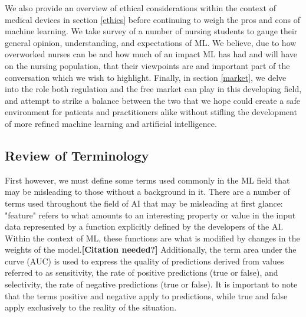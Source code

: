 \documentclass[]{article}
\begin{document}
		We also provide an overview of ethical considerations within the context of medical devices in section \ref{ethics} before continuing to weigh the pros and cons of machine learning. We take survey of a number of nursing students to gauge their general opinion, understanding, and expectations of ML. We believe, due to how overworked nurses can be\cite{doi:10.1111/j.1365-2648.2009.05082.x} and how much of an impact ML has had and will have on the nursing population\cite{Ham2017}, that their viewpoints are and important part of the conversation which we wish to highlight. Finally, in section \ref{market}, we delve into the role both regulation and the free market can play in this developing field, and attempt to strike a balance between the two that we hope could create a safe environment for patients and practitioners alike without stifling the development of more refined machine learning and artificial intelligence.

		\subsection{Review of Terminology}
			First however, we must define some terms used commonly in the ML field that may be misleading to those without a background in it. There are a number of terms used throughout the field of AI that may be misleading at first glance: "feature" refers to what amounts to an interesting property or value in the input data represented by a function explicitly defined by the developers of the AI. Within the context of ML, these functions are what is modified by changes in the weights of the model.\textbf{[Citation needed?]} Additionally, the term area under the curve (AUC) is used to express the quality of predictions derived from values referred to as sensitivity, the rate of positive predictions (true or false), and selectivity, the rate of negative predictions (true or false). It is important to note that the terms positive and negative apply to predictions, while true and false apply exclusively to the reality of the situation.\cite{introtoauc}
\end{document}
